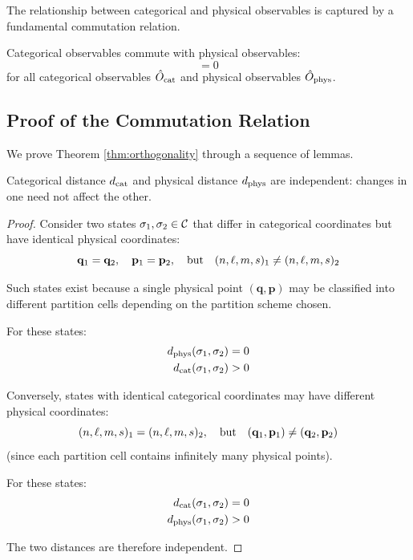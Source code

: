 The relationship between categorical and physical observables is captured by a fundamental commutation relation.

\begin{theorem}
\label{thm:orthogonality}
Categorical observables commute with physical observables:
\begin{equation}
[\Ocat, \Ophys] = 0
\label{eq:commutation}
\end{equation}
for all categorical observables $\hat{O}_{\mathrm{cat}}$ and physical observables $\hat{O}_{\mathrm{phys}}$.
\end{theorem}

\subsection{Proof of the Commutation Relation}

We prove Theorem \ref{thm:orthogonality} through a sequence of lemmas.

\begin{lemma}
\label{lem:distance_orthogonality}
Categorical distance $d_{\mathrm{cat}}$ and physical distance $d_{\mathrm{phys}}$ are independent: changes in one need not affect the other.
\end{lemma}

\begin{proof}
Consider two states $\sigma_1, \sigma_2 \in \mathcal{C}$ that differ in categorical coordinates but have identical physical coordinates:
\begin{equation}
\mathbf{q}_1 = \mathbf{q}_2, \quad \mathbf{p}_1 = \mathbf{p}_2, \quad \text{but} \quad (n,\ell,m,s)_1 \neq (n,\ell,m,s)_2
\end{equation}

Such states exist because a single physical point $(\mathbf{q}, \mathbf{p})$ may be classified into different partition cells depending on the partition scheme chosen.

For these states:
\begin{align}
d_{\mathrm{phys}}(\sigma_1, \sigma_2) &= 0 \\
d_{\mathrm{cat}}(\sigma_1, \sigma_2) &> 0
\end{align}

Conversely, states with identical categorical coordinates may have different physical coordinates:
\begin{equation}
(n,\ell,m,s)_1 = (n,\ell,m,s)_2, \quad \text{but} \quad (\mathbf{q}_1, \mathbf{p}_1) \neq (\mathbf{q}_2, \mathbf{p}_2)
\end{equation}
(since each partition cell contains infinitely many physical points).

For these states:
\begin{align}
d_{\mathrm{cat}}(\sigma_1, \sigma_2) &= 0 \\
d_{\mathrm{phys}}(\sigma_1, \sigma_2) &> 0
\end{align}

The two distances are therefore independent.
\end{proof}

